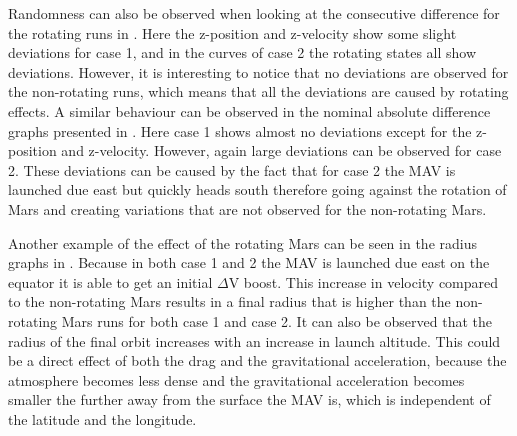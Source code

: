 \noindent
Randomness can also be observed when looking at the consecutive difference for the rotating runs in . Here the z-position and z-velocity show some slight deviations for case 1, and in the curves of case 2 the rotating states all show deviations. However, it is interesting to notice that no deviations are observed for the non-rotating runs, which means that all the deviations are caused by rotating effects. A similar behaviour can be observed in the nominal absolute difference graphs presented in . Here case 1 shows almost no deviations except for the z-position and z-velocity. However, again large deviations can be observed for case 2. These deviations can be caused by the fact that for case 2 the \ac{MAV} is launched due east but quickly heads south therefore going against the rotation of Mars and creating variations that are not observed for the non-rotating Mars.

Another example of the effect of the rotating Mars can be seen in the radius graphs in . Because in both case 1 and 2 the \ac{MAV} is launched due east on the equator it is able to get an initial $\Delta$V boost. This increase in velocity compared to the non-rotating Mars results in a final radius that is higher than the non-rotating Mars runs for both case 1 and case 2. It can also be observed that the radius of the final orbit increases with an increase in launch altitude. This could be a direct effect of both the drag and the gravitational acceleration, because the atmosphere becomes less dense and the gravitational acceleration becomes smaller the further away from the surface the \ac{MAV} is, which is independent of the latitude and the longitude.

